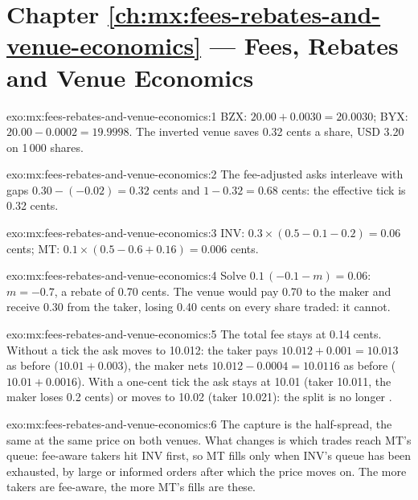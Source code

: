 \section*{Chapter \ref{ch:mx:fees-rebates-and-venue-economics} --- Fees, Rebates and Venue Economics}

\begin{solution}{exo:mx:fees-rebates-and-venue-economics:1}
BZX: $20.00+0.0030=20.0030$; BYX: $20.00-0.0002=19.9998$. The inverted venue saves 0.32 cents a share, USD 3.20 on 1\,000 shares.
\end{solution}

\begin{solution}{exo:mx:fees-rebates-and-venue-economics:2}
The fee-adjusted asks interleave with gaps $0.30-(-0.02)=0.32$ cents and $1-0.32=0.68$ cents: the effective tick is 0.32 cents.
\end{solution}

\begin{solution}{exo:mx:fees-rebates-and-venue-economics:3}
INV: $0.3\times(0.5-0.1-0.2)=0.06$ cents; MT: $0.1\times(0.5-0.6+0.16)=0.006$ cents.
\end{solution}

\begin{solution}{exo:mx:fees-rebates-and-venue-economics:4}
Solve $0.1\,(-0.1-m)=0.06$: $m=-0.7$, a rebate of 0.70 cents. The venue would pay 0.70 to the maker and receive 0.30 from the taker, losing 0.40 cents on
every share traded: it cannot.
\end{solution}

\begin{solution}{exo:mx:fees-rebates-and-venue-economics:5}
The total fee stays at 0.14 cents. Without a tick the ask moves to 10.012: the taker pays $10.012+0.001=10.013$ as before ($10.01+0.003$), the maker nets
$10.012-0.0004=10.0116$ as before ($10.01+0.0016$). With a one-cent tick the ask stays at 10.01 (taker 10.011, the maker loses 0.2 cents) or moves to 10.02
(taker 10.021): the split is no longer .
\end{solution}

\begin{solution}{exo:mx:fees-rebates-and-venue-economics:6}
The capture is the half-spread, the same at the same price on both venues. What changes is which trades reach MT's queue: fee-aware takers hit INV first,
so MT fills only when INV's queue has been exhausted, by large or informed orders after which the price moves on. The more takers are fee-aware, the
more MT's fills are these.
\end{solution}

